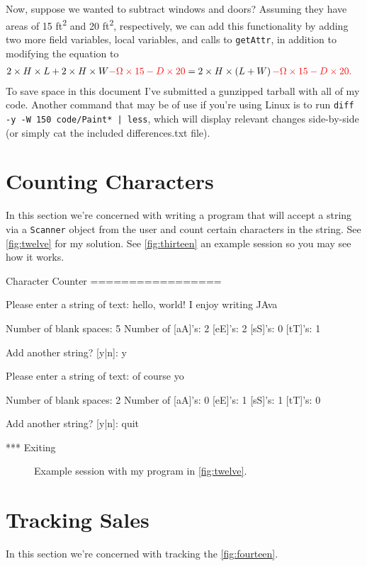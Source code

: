 \documentclass[leqno, 11pt]{article}
\begin{document}
Now, suppose we wanted to subtract windows and doors? Assuming they have areas of 15 \si{ft^{2}} and 20 \si{ft^{2}}, respectively, we can add this functionality by adding two more field variables, local variables, and calls to \texttt{getAttr}, in addition to modifying the equation to
\begin{align}
  2\times H\times L + 2\times H\times W \color{red}{- \Omega\times 15 - D\times 20}&=2\times H\times\left(L + W\right)\color{red}{- \Omega\times 15 - D\times 20}.\notag
\end{align}
To save space in this document I've submitted a gunzipped tarball with all of my code. Another command that may be of use if you're using Linux is to run \texttt{diff -y -W 150 code/Paint* | less}, which  will display relevant changes side-by-side (or simply cat the included differences.txt file).
\section*{Counting Characters}
In this section we're concerned with writing a program that will accept a string via a \texttt{Scanner} object from the user and count certain characters in the string. See \autoref{fig:twelve} for my solution. See \autoref{fig:thirteen} an example session so you may see how it works.
\begin{verbbox}[\mbox{}]
Character Counter
=================

Please enter a string of text: hello, world! I enjoy writing JAva

Number of blank spaces: 5
Number of [aA]'s: 2
          [eE]'s: 2
          [sS]'s: 0
          [tT]'s: 1

Add another string? [y|n]: y

Please enter a string of text: of course yo

Number of blank spaces: 2
Number of [aA]'s: 0
          [eE]'s: 1
          [sS]'s: 1
          [tT]'s: 0

Add another string? [y|n]: quit

*** Exiting
\end{verbbox}
\begin{figure}[t!]
  \centering
  \theverbbox
  \caption{Example session with my program in \autoref{fig:twelve}.}
  \label{fig:thirteen}
\end{figure}
\section*{Tracking Sales}
In this section we're concerned with tracking the \autoref{fig:fourteen}.
\end{document}
